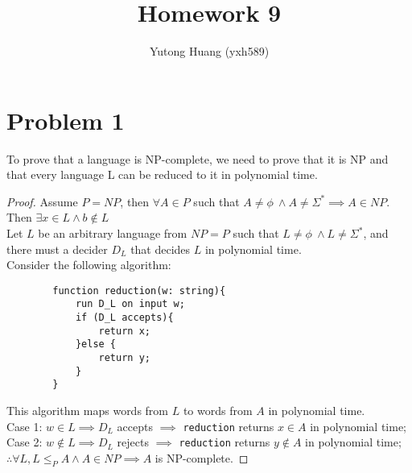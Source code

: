 \documentclass[letterpaper]{article}
\title{\vspace{-2cm}Homework 9}
\author{Yutong Huang (yxh589)}
\date{}
\begin{document}
\maketitle
\section*{Problem 1}
To prove that a language is NP-complete, we need to prove that it is NP and that every language L can be reduced to it in polynomial time.
\begin{proof}
    Assume $P=NP$, then $\forall A \in P$ such that $A \neq \phi\ \land A\neq \Sigma^* \implies A \in NP$. Then $\exists x \in L \land b\notin L$\\
    Let $L$ be an arbitrary language from $NP=P$ such that $L \neq \phi\ \land L\neq \Sigma^*$, and there must a decider $D_L$ that decides $L$ in polynomial time.\\
    Consider the following algorithm:
    \begin{verbatim}
        function reduction(w: string){
            run D_L on input w;
            if (D_L accepts){
                return x;
            }else {
                return y;
            }
        }
    \end{verbatim}
    This algorithm maps words from $L$ to words from $A$ in polynomial time.\\
    Case 1: $w \in L \implies D_L$ accepts $\implies$ \verb#reduction# returns $x \in A$ in polynomial time;\\
    Case 2: $w \notin L \implies D_L$ rejects $\implies$ \verb#reduction# returns $y \notin A$ in polynomial time;\\
    $\therefore \forall L, L \leq_P A \land A\in NP \implies A$ is NP-complete.
\end{proof}
\end{document}
